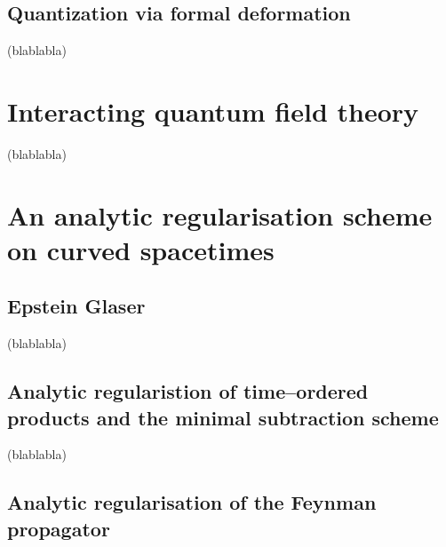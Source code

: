 \documentclass[11pt]{book}
\begin{document}
\section{Quantization via formal deformation}


(blablabla)


\chapter{Interacting quantum field theory}

(blablabla)

\chapter{An analytic regularisation scheme on curved spacetimes}

\section{Epstein Glaser}

(blablabla)

\section{Analytic regularistion of time–ordered products and the minimal subtraction scheme}

(blablabla)

\section{Analytic regularisation of the Feynman propagator}
\end{document}
